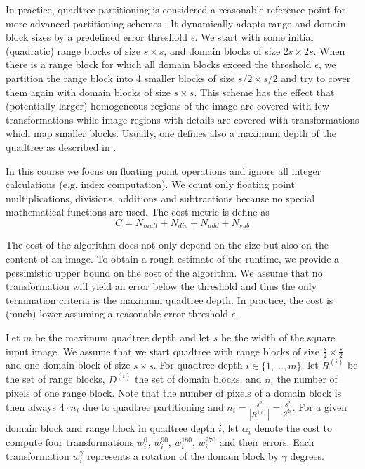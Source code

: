  In practice, quadtree partitioning is considered
a reasonable reference point for more advanced partitioning schemes
\cite{fisher2012}. It dynamically adapts range and domain block sizes by a
predefined error threshold $\epsilon$. We start with some initial (quadratic)
range blocks of size $s \times s$, and domain blocks of size $2s \times 2s$.
When there is a range block for which all domain blocks exceed the threshold
$\epsilon$, we partition the range block into 4 smaller blocks of size
$s/2 \times s/2$ and try to cover them again with domain blocks of size
$s \times s$. This scheme has the effect that (potentially larger) homogeneous
regions of the image are covered with few transformations while image regions
with details are covered with transformations which map smaller blocks. Usually,
one defines also a maximum depth of the quadtree as described in
\cite{fisher2012}.

 In this course we focus on floating point operations and ignore all
integer calculations (e.g. index computation). We count only floating point
multiplications, divisions, additions and subtractions because no special mathematical functions are used. 
The cost metric is define as
\begin{equation} \label{eq:cost}
C = N_{mult} + N_{div} + N_{add} + N_{sub}
\end{equation}

The cost of the algorithm does not only depend on the size but also on the content
of an image. To obtain a rough estimate of the runtime, we provide a
pessimistic upper bound on the cost of the algorithm. We assume that no transformation
will yield an error below the threshold and thus the only termination criteria is the
maximum quadtree depth. In practice, the cost is (much) lower assuming a reasonable
error threshold $\epsilon$.

Let $m$ be the maximum quadtree depth and let $s$ be the width of the square
input image. We assume that we start quadtree with range blocks of size
$\frac{s}{2}\times\frac{s}{2}$ and one domain block of size $s \times s$. For
quadtree depth $i \in \{1, \dots, m\}$, let $R^{(i)}$ be the set of range
blocks, $D^{(i)}$ the set of domain blocks, and $n_{i}$ the number of pixels of
one range block. Note that the number of pixels of a domain block is then always
$4\cdot n_{i}$ due to quadtree partitioning and $n_i=\frac{s^2}{|R^{(i)}|} = \frac{s^2}{2^{2i}}$. 
For a given domain block and range block in quadtree depth $i$,
let $\alpha_{i}$ denote the cost to compute four transformations $w_i^{0}$,
$w_i^{90}$, $w_i^{180}$, $w_i^{270}$ and their errors. Each transformation
$w_i^{\gamma}$ represents a rotation of the domain block by $\gamma$ degrees.


